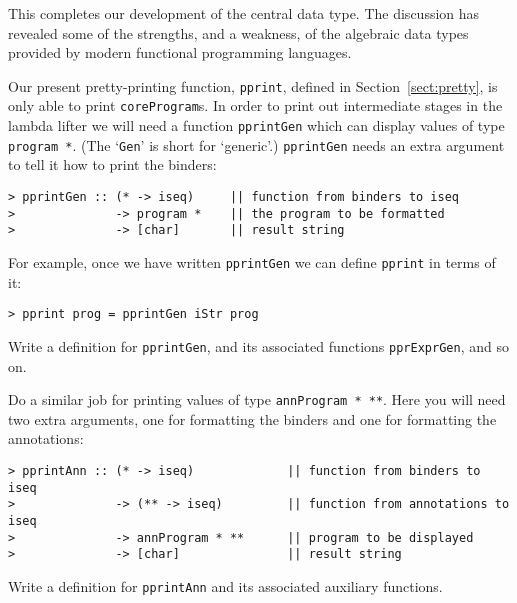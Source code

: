This completes our development of the central data type.  The
discussion has revealed some of the strengths, and a
weakness, of the algebraic data types provided by modern
functional programming languages.

\begin{exercise}
\label{ll:X:eprint}
Our present pretty-printing function, \mbox{\tt pprint}, defined in
Section~\ref{sect:pretty}, is only able to print \mbox{\tt coreProgram}s.
In order to print out intermediate stages in the lambda lifter we will
need a function \mbox{\tt pprintGen} which can display values of type \mbox{\tt program\ *}.
(The `\mbox{\tt Gen}' is short for `generic'.)
\mbox{\tt pprintGen} needs an extra argument to tell it how to print
the binders:
\begin{verbatim}
> pprintGen :: (* -> iseq)     || function from binders to iseq
>              -> program *    || the program to be formatted
>              -> [char]       || result string
\end{verbatim}
%
For example, once we have written \mbox{\tt pprintGen} we can define \mbox{\tt pprint} in
terms of it:
\begin{verbatim}
> pprint prog = pprintGen iStr prog
\end{verbatim}
%
Write a definition for \mbox{\tt pprintGen}, and its associated functions \mbox{\tt pprExprGen},
and so on.
\end{exercise}
\begin{exercise}
Do a similar job for printing values of type \mbox{\tt annProgram\ *\ **}.  Here you
will need two extra arguments, one for formatting the binders and one for
formatting the annotations:
\begin{verbatim}
> pprintAnn :: (* -> iseq)             || function from binders to iseq
>              -> (** -> iseq)         || function from annotations to iseq
>              -> annProgram * **      || program to be displayed
>              -> [char]               || result string
\end{verbatim}
%
Write a definition for \mbox{\tt pprintAnn} and its associated auxiliary functions.
\end{exercise}


